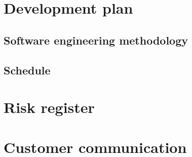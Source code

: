 \documentclass[10pt,a4paper]{article}
\begin{document}
\section{Development plan}

\subsection{Software engineering methodology}

\subsection{Schedule}


\section{Risk register}


\section{Customer communication}
\end{document}
